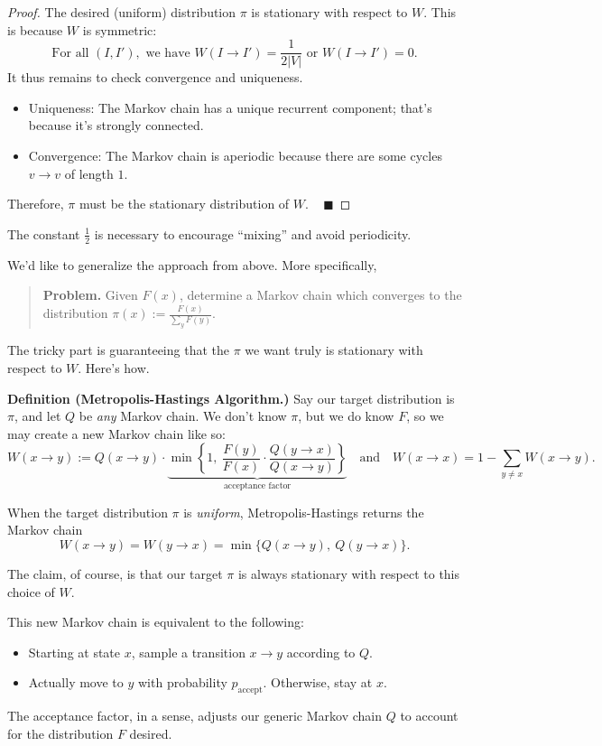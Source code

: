 \begin{proof}
The desired (uniform) distribution $\pi$ is stationary with respect to $W$.  This is because $W$ is symmetric:
\[ \text{For all } (I, I'), \text{ we have } W(I \to I') = \frac{1}{2 |V|} \text{ or } W(I \to I') = 0. \]
It thus remains to check convergence and uniqueness.
\begin{itemize}
    \item Uniqueness: The Markov chain has a unique recurrent component; that's because it's strongly connected.
    \item Convergence: The Markov chain is aperiodic because there are some cycles $v \to v$ of length $1$. 
\end{itemize}
Therefore, $\pi$ must be the stationary distribution of $W$. ~ $\blacksquare$
\end{proof}

\begin{remark}
    The constant $\frac{1}{2}$ is necessary to encourage ``mixing'' and avoid periodicity.
\end{remark}

We'd like to generalize the approach from above.  More specifically,
\begin{quote}
    \textbf{Problem.} Given $F(x)$, determine a Markov chain which converges to the distribution $\pi(x) := \frac{F(x)}{\sum_y F(y)}$.
\end{quote}
The tricky part is guaranteeing that the $\pi$ we want truly is stationary with respect to $W$.  Here's how.

\textbf{Definition (Metropolis-Hastings Algorithm.)} Say our target distribution is $\pi$, and let $Q$ be \emph{any} Markov chain.  We don't know $\pi$, but we do know $F$, so we may create a new Markov chain like so:
\[ W(x \to y) := Q(x \to y) \cdot \underbrace{\min \left \{ 1, \ \dfrac{F(y)}{F(x)} \cdot \dfrac{Q(y \to x)}{Q(x \to y)} \right \}}_{\text{acceptance factor}} ~~~ \text{ and } ~~~ W(x \to x) = 1 - \sum_{y \neq x} W(x \to y). \]
\begin{remark}
    When the target distribution $\pi$ is \emph{uniform}, Metropolis-Hastings returns the Markov chain
    \[ W(x \to y) = W(y \to x) = \min \{ Q(x \to y), \ Q(y \to x)\}. \]
\end{remark}
The claim, of course, is that our target $\pi$ is always stationary with respect to this choice of $W$.

\begin{remark}
This new Markov chain is equivalent to the following:
\begin{itemize}
    \item Starting at state $x$, sample a transition $x \to y$ according to $Q$.
    \item Actually move to $y$ with probability $p_{\text{accept}}$.  Otherwise, stay at $x$.
\end{itemize}
The acceptance factor, in a sense, adjusts our generic Markov chain $Q$ to account for the distribution $F$ desired.
\end{remark}

